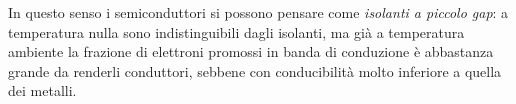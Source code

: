 In questo senso i semiconduttori si possono pensare come \emph{isolanti a piccolo gap}: a temperatura nulla sono indistinguibili dagli isolanti, ma già a temperatura ambiente la frazione di elettroni promossi in banda di conduzione è abbastanza grande da renderli conduttori, sebbene con conducibilità molto inferiore a quella dei metalli.


